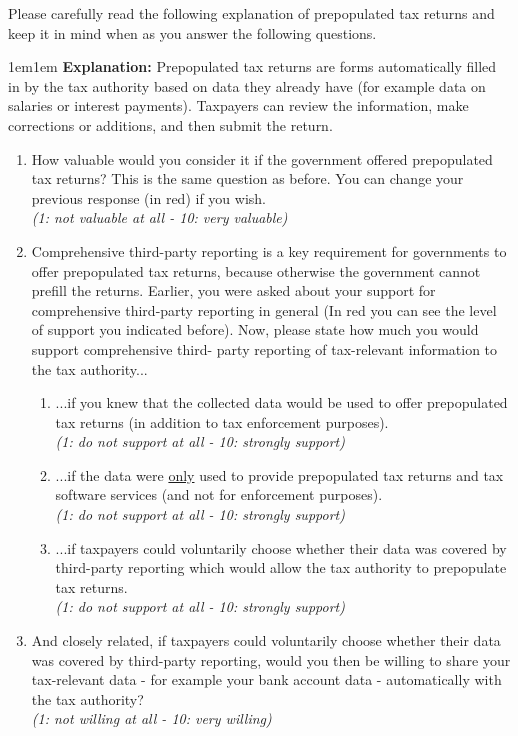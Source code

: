 \documentclass[11pt]{article}
\begin{document}
\vspace{0.5em}
\noindent Please carefully read the following explanation of prepopulated tax returns and keep it in mind when as you answer the following questions. \\
\begin{adjustwidth}{1em}{1em} \textbf{Explanation:} Prepopulated tax returns are forms automatically filled in by the tax authority  based on data they already have (for example data on salaries or interest payments). Taxpayers can review the information, make corrections or additions, and then submit the return.
\end{adjustwidth}
\begin{enumerate}[resume]
    \item How valuable would you consider it if the government offered prepopulated tax returns? This is the same question as before. You can change your previous response (in red) if you wish.\\
    \textit{(1: not valuable at all - 10: very valuable)}
    \item Comprehensive third-party reporting is a key requirement for governments to offer prepopulated tax returns, because otherwise the government cannot prefill the returns. Earlier, you were asked about your support for comprehensive third-party reporting in general (In red you can see the level of support you indicated before). Now, please state how much you would support comprehensive third- party reporting of tax-relevant information to the tax authority... 
    \begin{enumerate}
    \item ...if you knew that the collected data would be used to offer prepopulated tax returns (in addition to tax enforcement purposes).\\ \textit{(1: do not support at all - 10: strongly support)}    
    \item ...if the data were \underline{only} used to provide prepopulated tax returns and tax software services (and not for enforcement purposes).\\ \textit{(1: do not support at all - 10: strongly support)}
    \item ...if taxpayers could voluntarily choose whether their data was covered by third-party reporting which would allow the tax authority to prepopulate tax returns. \\
    \textit{(1: do not support at all - 10: strongly support)}
    \end{enumerate}
    \item And closely related, if taxpayers could voluntarily choose whether their data was covered by third-party reporting, would you then be willing to share your tax-relevant  data - for example your bank account data - automatically with the tax authority?   \\
    \textit{(1: not willing at all - 10: very willing)}
\end{enumerate}
\end{document}
